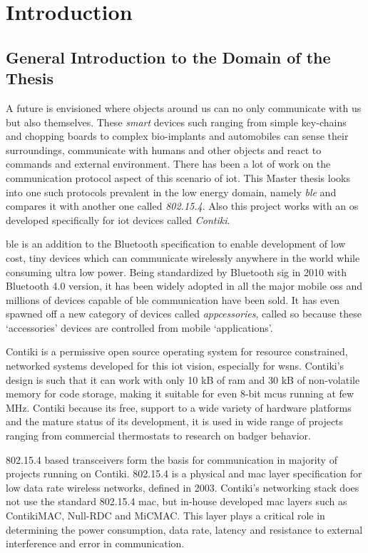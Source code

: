 \chapter{Introduction}

\section{General Introduction to the Domain of the Thesis}

A future is envisioned where objects around us can no only communicate with us but also themselves. These \emph{smart} devices such ranging from simple key-chains and chopping boards to complex bio-implants and automobiles can sense their surroundings, communicate with humans and other objects and react to commands and external environment. There has been a lot of work on the communication protocol aspect of this scenario of \gls{iot}. This Master thesis looks into one such protocols prevalent in the low energy domain, namely \emph{\gls{ble}} and compares it with another one called \emph{802.15.4}. Also this project works with an \gls{os} developed specifically for \gls{iot} devices called \emph{Contiki}.

\gls{ble} is an addition to the Bluetooth specification to enable  development of low cost, tiny devices which can communicate wirelessly anywhere in the world while consuming ultra low power\cite{CoreSpec4.0}. Being standardized by Bluetooth \gls{sig} in 2010 with Bluetooth 4.0 version, it has been widely adopted in all the major mobile \glspl{os} and millions of devices capable of \gls{ble} communication have been sold. It has even spawned off a new category of devices called \emph{appcessories}\cite{ubiquityBeyond}, called so because these `accessories' devices are controlled from mobile `applications'. 

Contiki is a permissive open source operating system for resource constrained, networked systems developed for this \gls{iot} vision, especially for \glspl{wsn}\cite{Contiki}. Contiki's design is such that it can work with only 10 kB of \gls{ram} and 30 kB of non-volatile memory for code storage, making it suitable for even 8-bit \glspl{mcu} running at few MHz. Contiki because its free, support to a wide variety of hardware platforms and the mature status of its development, it is used in wide range of projects ranging from commercial thermostats to research on badger behavior. 

802.15.4 based transceivers form the basis for communication in majority of projects running on Contiki. 802.15.4 is a physical and \gls{mac} layer specification for low data rate wireless networks, defined in 2003\cite{IEEE802154}. Contiki's networking stack does not use the standard 802.15.4 \gls{mac}, but in-house developed \gls{mac} layers such as ContikiMAC, Null-RDC and MiCMAC. This layer plays a critical role in determining the power consumption, data rate, latency and resistance to external interference and error in communication. 


